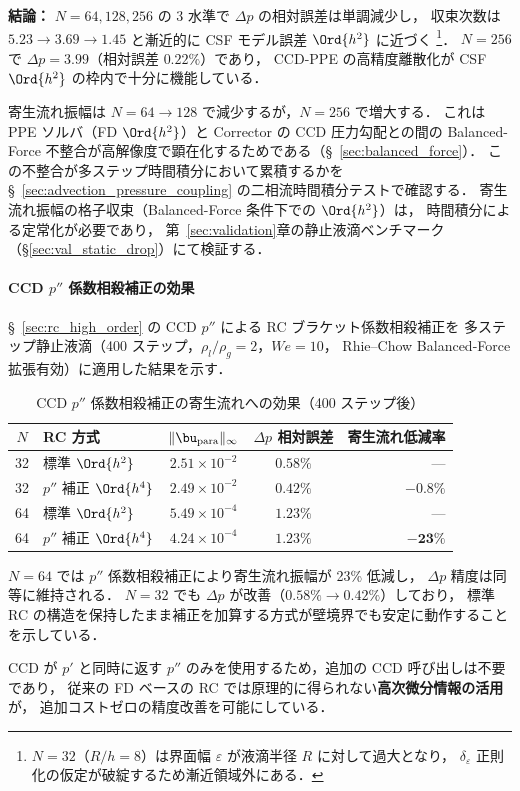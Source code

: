 \noindent\textbf{結論：}
$N = 64, 128, 256$ の 3 水準で $\Delta p$ の相対誤差は単調減少し，
収束次数は $5.23 \to 3.69 \to 1.45$ と漸近的に CSF モデル誤差 $\Ord{h^2}$ に近づく%
\footnote{$N = 32$（$R/h = 8$）は界面幅 $\varepsilon$ が液滴半径 $R$ に対して過大となり，
$\delta_\varepsilon$ 正則化の仮定が破綻するため漸近領域外にある．}．
$N = 256$ で $\Delta p = 3.99$（相対誤差 $0.22\%$）であり，
CCD-PPE の高精度離散化が CSF $\Ord{h^2}$ の枠内で十分に機能している．

寄生流れ振幅は $N = 64 \to 128$ で減少するが，$N = 256$ で増大する．
これは PPE ソルバ（FD $\Ord{h^2}$）と Corrector の CCD 圧力勾配との間の
Balanced-Force 不整合が高解像度で顕在化するためである（§~\ref{sec:balanced_force}）．
この不整合が多ステップ時間積分において累積するかを
§~\ref{sec:advection_pressure_coupling} の二相流時間積分テストで確認する．
寄生流れ振幅の格子収束（Balanced-Force 条件下での $\Ord{h^2}$）は，
時間積分による定常化が必要であり，
第~\ref{sec:validation}章の静止液滴ベンチマーク（§\ref{sec:val_static_drop}）にて検証する．

\paragraph{CCD $p''$ 係数相殺補正の効果}

§~\ref{sec:rc_high_order} の CCD $p''$ による RC ブラケット係数相殺補正を
多ステップ静止液滴（400 ステップ，$\rho_l/\rho_g = 2$，$\mathit{We} = 10$，
Rhie--Chow Balanced-Force 拡張有効）に適用した結果を示す．

\begin{table}[htbp]
\centering
\caption{CCD $p''$ 係数相殺補正の寄生流れへの効果（400 ステップ後）}
\label{tab:rc_d2fd_droplet}
\renewcommand{\arraystretch}{1.3}
\begin{tabular}{clccr}
\toprule
$N$ & RC 方式 & $\|\bu_{\mathrm{para}}\|_\infty$ & $\Delta p$ 相対誤差 & 寄生流れ低減率 \\
\midrule
32 & 標準 $\Ord{h^2}$       & $2.51 \times 10^{-2}$ & $0.58\%$ & --- \\
32 & $p''$ 補正 $\Ord{h^4}$  & $2.49 \times 10^{-2}$ & $0.42\%$ & $\mathbf{-0.8\%}$ \\
\midrule
64 & 標準 $\Ord{h^2}$       & $5.49 \times 10^{-4}$ & $1.23\%$ & --- \\
64 & $p''$ 補正 $\Ord{h^4}$  & $4.24 \times 10^{-4}$ & $1.23\%$ & $\mathbf{-23\%}$ \\
\bottomrule
\end{tabular}
\end{table}

$N = 64$ では $p''$ 係数相殺補正により寄生流れ振幅が 23\% 低減し，
$\Delta p$ 精度は同等に維持される．
$N = 32$ でも $\Delta p$ が改善（$0.58\% \to 0.42\%$）しており，
標準 RC の構造を保持したまま補正を加算する方式が壁境界でも安定に動作することを示している．

CCD が $p'$ と同時に返す $p''$ のみを使用するため，追加の CCD 呼び出しは不要であり，
従来の FD ベースの RC では原理的に得られない\textbf{高次微分情報の活用}が，
追加コストゼロの精度改善を可能にしている．
